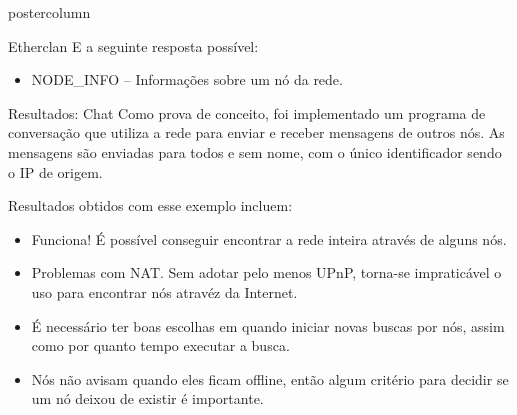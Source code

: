 \documentclass[final]{beamer}
\begin{document}
\begin{frame}
\begin{columns}
\begin{column}{.5\textwidth}
\begin{beamercolorbox}[center,wd=\textwidth]{postercolumn}
\begin{minipage}[T]{.95\textwidth}
{\begin{block}{Etherclan}
                E a seguinte resposta possível:
                \begin{itemize}
                  \item NODE\_INFO -- Informações sobre um nó da rede.
                \end{itemize}
                
                \vspace*{0.2cm} 
            \end{block}

            \vspace*{0.2cm} 
            
            \begin{block}{Resultados: Chat}
              \justifying 
                Como prova de conceito, foi implementado um programa de conversação que utiliza a rede para enviar e receber
                mensagens de outros nós. As mensagens são enviadas para todos e sem nome, com o único identificador sendo o IP
                de origem.
                
                
                \vspace*{0.4cm}
                
                Resultados obtidos com esse exemplo incluem:
                \begin{itemize}
                  \item Funciona! É possível conseguir encontrar a rede inteira através de alguns nós.
                  \item Problemas com NAT. Sem adotar pelo menos UPnP, torna-se impraticável o uso para encontrar nós atravéz da Internet.
                  \item É necessário ter boas escolhas em quando iniciar novas buscas por nós, assim como por quanto tempo executar a busca.
                  \item Nós não avisam quando eles ficam offline, então algum critério para decidir se um nó deixou de existir é importante.
                \end{itemize}
                

\end{block}}
\end{minipage}
\end{beamercolorbox}
\end{column}
\end{columns}
\end{frame}
\end{document}
